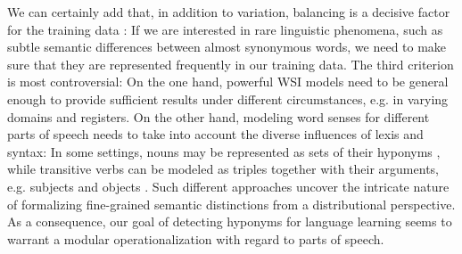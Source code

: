 We can certainly add that, in addition to variation, balancing is a decisive factor for the training data \parencites[620]{liuCombiningIntegratedSampling2011}[9]{weiRoleBalancedTraining2013}[1127]{boneApplyingMachineLearning2015}: If we are interested in rare linguistic phenomena, such as subtle semantic differences between almost synonymous words, we need to make sure that they are represented frequently in our training data. The third criterion is most controversial: On the one hand, powerful \gls{WSI} models need to be general enough to provide sufficient results under different circumstances, e.g. in varying domains and registers. On the other hand, modeling word senses for different parts of speech needs to take into account the diverse influences of lexis and syntax: In some settings, nouns may be represented as sets of their hyponyms \parencite[640]{lewisCompositionalHyponymyPositive2019}, while transitive verbs can be modeled as triples together with their arguments, e.g. subjects and objects \parencite[9]{grefenstetteExperimentalSupportCategorical2011}. Such different approaches uncover the intricate nature of formalizing fine-grained semantic distinctions from a distributional perspective. As a consequence, our goal of detecting hyponyms for language learning seems to warrant a modular operationalization with regard to parts of speech. 